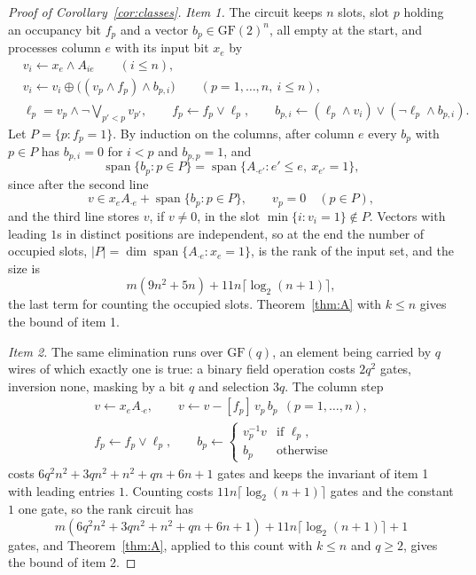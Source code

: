 \begin{proof}[Proof of Corollary~\ref{cor:classes}]
\emph{Item 1.}  The circuit keeps $n$ slots, slot $p$ holding an occupancy bit
$f_p$ and a vector $b_p\in\mathrm{GF}(2)^{n}$, all empty at the start, and
processes column $e$ with its input bit $x_e$ by
\begin{align*}
  &v_i\leftarrow x_e\wedge A_{ie}\qquad(i\le n),\\
  &v_i\leftarrow v_i\oplus\bigl((v_p\wedge f_p)\wedge b_{p,i}\bigr)\qquad(p=1,\ldots,n,\ i\le n),\\
  &\ell_p=v_p\wedge\neg\textstyle\bigvee_{p'<p}v_{p'},\qquad f_p\leftarrow f_p\vee\ell_p,\qquad
   b_{p,i}\leftarrow(\ell_p\wedge v_i)\vee(\neg\ell_p\wedge b_{p,i}).
\end{align*}
Let $P=\{p:f_p=1\}$.  By induction on the columns, after column $e$ every $b_p$ with
$p\in P$ has $b_{p,i}=0$ for $i<p$ and $b_{p,p}=1$, and
\[
  \operatorname{span}\{b_p:p\in P\}=\operatorname{span}\{A_{\cdot e'}:e'\le e,\ x_{e'}=1\},
\]
since after the second line
\[
  v\in x_eA_{\cdot e}+\operatorname{span}\{b_p:p\in P\},\qquad v_p=0\quad(p\in P),
\]
and the third line stores $v$, if $v\ne0$, in the slot $\min\{i:v_i=1\}\notin P$.
Vectors with leading $1$s in distinct positions are independent, so at the end
the number of occupied slots, $|P|=\dim\operatorname{span}\{A_{\cdot e}:x_e=1\}$, is
the rank of the input set, and the size is
\[
  m(9n^{2}+5n)+11n\lceil\log_2(n+1)\rceil,
\]
the last term for counting the occupied slots.  Theorem~\ref{thm:A} with $k\le n$ gives the bound of item 1.

\emph{Item 2.}  The same elimination runs over $\mathrm{GF}(q)$, an element
being carried by $q$ wires of which exactly one is true: a binary field operation
costs $2q^{2}$ gates, inversion none, masking by a bit $q$ and selection $3q$.
The column step
\[
  \begin{gathered}
  v\leftarrow x_eA_{\cdot e},\qquad v\leftarrow v-[f_p]\,v_p\,b_p\ \ (p=1,\ldots,n),\\
  f_p\leftarrow f_p\vee\ell_p,\qquad
  b_p\leftarrow\begin{cases}v_p^{-1}v&\text{if }\ell_p,\\b_p&\text{otherwise}\end{cases}
  \end{gathered}
\]
costs $6q^{2}n^{2}+3qn^{2}+n^{2}+qn+6n+1$ gates and keeps the invariant of item 1
with leading entries $1$.  Counting costs $11n\lceil\log_2(n+1)\rceil$ gates and the constant $1$ one gate, so the rank circuit has
\[
  m(6q^{2}n^{2}+3qn^{2}+n^{2}+qn+6n+1)+11n\lceil\log_2(n+1)\rceil+1
\]
gates, and Theorem~\ref{thm:A}, applied to this count with $k\le n$ and $q\ge2$, gives the bound of item 2.


\end{proof}
